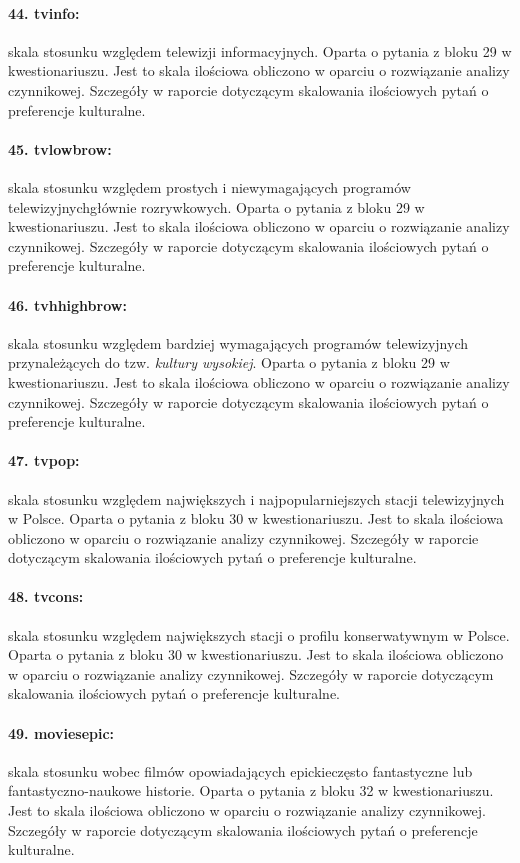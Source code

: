 \documentclass[10pt, a4paper]{article}
\begin{document}
\paragraph{44. tvinfo:} skala stosunku względem telewizji informacyjnych. Oparta o pytania z bloku 29 w kwestionariuszu. Jest to skala ilościowa obliczono w oparciu o rozwiązanie analizy czynnikowej. Szczegóły w raporcie dotyczącym skalowania ilościowych pytań o preferencje kulturalne.
\paragraph{45. tvlowbrow:} skala stosunku względem prostych i niewymagających programów telewizyjnych\textemdash głównie rozrywkowych. Oparta o pytania z bloku 29 w kwestionariuszu. Jest to skala ilościowa obliczono w oparciu o rozwiązanie analizy czynnikowej. Szczegóły w raporcie dotyczącym skalowania ilościowych pytań o preferencje kulturalne.
\paragraph{46. tvhhighbrow:} skala stosunku względem bardziej wymagających programów telewizyjnych przynależących do tzw. {\it kultury wysokiej}. Oparta o pytania z bloku 29 w kwestionariuszu. Jest to skala ilościowa obliczono w oparciu o rozwiązanie analizy czynnikowej. Szczegóły w raporcie dotyczącym skalowania ilościowych pytań o preferencje kulturalne.
\paragraph{47. tvpop:} skala stosunku względem największych i najpopularniejszych stacji telewizyjnych w Polsce. Oparta o pytania z bloku 30 w kwestionariuszu. Jest to skala ilościowa obliczono w oparciu o rozwiązanie analizy czynnikowej. Szczegóły w raporcie dotyczącym skalowania ilościowych pytań o preferencje kulturalne.
\paragraph{48. tvcons:} skala stosunku względem największych stacji o profilu konserwatywnym w Polsce. Oparta o pytania z bloku 30 w kwestionariuszu. Jest to skala ilościowa obliczono w oparciu o rozwiązanie analizy czynnikowej. Szczegóły w raporcie dotyczącym skalowania ilościowych pytań o preferencje kulturalne.
\paragraph{49. moviesepic:} skala stosunku wobec filmów opowiadających epickie\textemdash często fantastyczne lub fantastyczno-naukowe \textemdash historie. Oparta o pytania z bloku 32 w kwestionariuszu. Jest to skala ilościowa obliczono w oparciu o rozwiązanie analizy czynnikowej. Szczegóły w raporcie dotyczącym skalowania ilościowych pytań o preferencje kulturalne.
\end{document}
